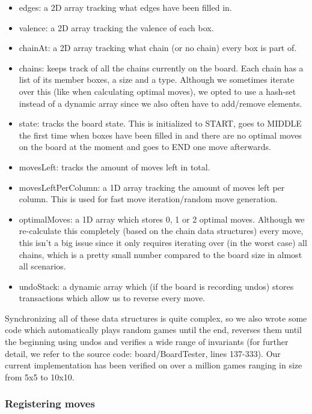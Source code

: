 \begin{itemize}
\item edges: a 2D array tracking what edges have been filled in.
\item valence: a 2D array tracking the valence of each box.
\item chainAt: a 2D array tracking what chain (or no chain) every box is part of.
\item chains: keeps track of all the chains currently on the board. Each chain has a list of its member boxes, a size and a type. Although we sometimes iterate over this (like when calculating optimal moves), we opted to use a hash-set instead of a dynamic array since we also often have to add/remove elements.
\item state: tracks the board state. This is initialized to START, goes to MIDDLE the first time when boxes have been filled in and there are no optimal moves on the board at the moment and goes to END one move afterwards.
\item movesLeft: tracks the amount of moves left in total.
\item movesLeftPerColumn: a 1D array tracking the amount of moves left per column. This is used for fast move iteration/random move generation.
\item optimalMoves: a 1D array which stores 0, 1 or 2 optimal moves. Although we re-calculate this completely (based on the chain data structures) every move, this isn't a big issue since it only requires iterating over (in the worst case) all chains, which is a pretty small number compared to the board size in almost all scenarios.
\item undoStack: a dynamic array which (if the board is recording undos) stores transactions which allow us to reverse every move.
\end{itemize}

Synchronizing all of these data structures is quite complex, so we also wrote some code which automatically plays random games until the end, reverses them until the beginning using undos and verifies a wide range of invariants (for further detail, we refer to the source code: board/BoardTester, lines 137-333). Our current implementation has been verified on over a million games ranging in size from 5x5 to 10x10.

\subsubsection{Registering moves}

